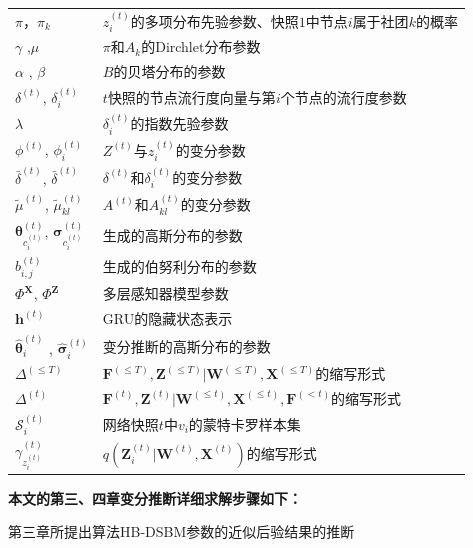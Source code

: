 \begin{center}
\begin{longtable}{@{}lp{300pt}@{}}
			$\pi$，$\pi_k$ & $z^{(t)}_i$的多项分布先验参数、快照$1$中节点$i$属于社团$k$的概率\\
			${\gamma}$ ,${\mu}$ & ${\pi}$和${A}_k$的Dirchlet分布参数 \\
			${\alpha}$ , ${\beta}$ & $B$的贝塔分布的参数 \\   
			$\delta^{(t)}$, $\delta_i^{(t)}$ & $t$快照的节点流行度向量与第$i$个节点的流行度参数 \\
			$\lambda$ & $\delta_i^{(t)}$的指数先验参数 \\
			$\phi^{(t)}$, $\phi^{(t)}_i$ &$Z^{(t)}$与$z^{(t)}_i$的变分参数 \\
			$\bar{\delta}^{(t)}$, $\bar{\delta}^{(t)}$ &$\delta^{(t)}$和$\delta^{(t)}_i$的变分参数 \\
			$\tilde{\mu}^{(t)}$, $\tilde{\mu}^{(t)}_{kl}$ &$A^{(t)}$和$A^{(t)}_{kl}$的变分参数 \\
			$\bm{\theta}_{c_i^{(t)}}^{(t)}$, $\bm{\sigma}_{c_i^{(t)}}^{(t)}$ & 生成的高斯分布的参数\\
			$b_{i,j}^{(t)}$ &  生成的伯努利分布的参数 \\
			$\Phi^{\mathbf{X}}$, $\Phi^{\mathbf{Z}}$& 多层感知器模型参数\\
			$\mathbf{h}^{(t)}$ & GRU的隐藏状态表示 \\
			$\hat{\bm{\theta}}^{(t)}_i$ , $\hat{\bm{\sigma}}^{(t)}_i$ & 变分推断的高斯分布的参数 \\
			$\Delta^{(\leq T)}$ & $\mathbf{F}^{(\leq T)}, \mathbf{Z}^{(\leq T)}|\mathbf{W}^{(\leq T)},\mathbf{X}^{(\leq T)}$的缩写形式 \\
			$\Delta^{(t)}$ & $\mathbf{F}^{(t)}, \mathbf{Z}^{(t)}|\mathbf{W}^{(\leq t)},\mathbf{X}^{(\leq t)},\mathbf{F}^{(< t)}$的缩写形式\\
			$\mathcal{S}_i^{(t)}$ & 网络快照$t$中$v_i$的蒙特卡罗样本集 \\
			$\gamma_{z_i^{(t)}}^{(t)}$ & $q(\mathbf{Z}_i^{(t)}|\mathbf{W}^{(t)},\mathbf{X}^{(t)})$的缩写形式 \\
			\bottomrule[1.5pt]
	\end{longtable}
\end{center}

\noindent\textbf{本文的第三、四章变分推断详细求解步骤如下：}
\begin{proposition}
	第三章所提出算法HB-DSBM参数的近似后验结果的推断
	\label{HB-DSBM:inference}
\end{proposition}


